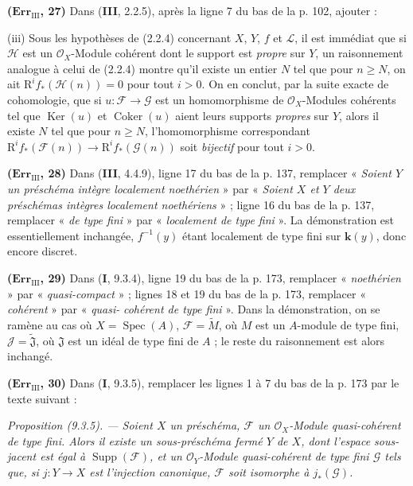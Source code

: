 \noindent\textbf{($\mathbf{Err}_{\mathrm{III}}$, 27)} Dans (\textbf{III}, 2.2.5),
après la ligne 7 du bas de la p. 102, ajouter :

(iii) Sous les hypothèses de (2.2.4) concernant $X$, $Y$, $f$ et $\mathscr L$,
il est immédiat que si $\mathscr H$ est un $\mathscr O_X$-Module cohérent dont
le support est \emph{propre} sur $Y$, un raisonnement analogue à celui de
(2.2.4) montre qu'il existe un entier $N$ tel que pour $n\geq N$, on ait
$\mathrm R^if_*(\mathscr H(n))=0$ pour tout $i>0$. On en conclut, par la suite
exacte de cohomologie, que si $u:\mathscr F\to\mathscr G$ est un homomorphisme
de $\mathscr O_X$-Modules cohérents tel que $\operatorname{Ker}(u)$ et
$\operatorname{Coker}(u)$ aient leurs supports \emph{propres} sur $Y$, alors il
existe $N$ tel que pour $n\geq N$, l'homomorphisme correspondant
$\mathrm R^if_*(\mathscr F(n))\to\mathrm R^if_*(\mathscr G(n))$ soit
\emph{bijectif} pour tout $i>0$.

\noindent\textbf{($\mathbf{Err}_{\mathrm{III}}$, 28)} Dans (\textbf{III}, 4.4.9),
ligne 17 du bas de la p. 137, remplacer « \emph{Soient $Y$ un préschéma
intègre localement noethérien} » par « \emph{Soient $X$ et $Y$ deux
préschémas intègres localement noethériens} » ; ligne 16 du bas de la p.
137, remplacer « \emph{de type fini} » par « \emph{localement de type
fini} ». La démonstration est essentiellement inchangée,
$f^{-1}(y)$ étant localement de type fini sur $\boldsymbol{k}(y)$, donc encore discret.

\noindent\textbf{($\mathbf{Err}_{\mathrm{III}}$, 29)} Dans (\textbf{I}, 9.3.4), ligne
19 du bas de la p. 173, remplacer « \emph{noethérien} » par
« \emph{quasi-compact} » ; lignes 18 et 19 du bas de la p. 173, remplacer
« \emph{cohérent} » par « \emph{quasi-}%
\emph{cohérent de type fini} ». Dans la
démonstration, on se ramène au cas où
$X=\operatorname{Spec}(A)$, $\mathscr F=\widetilde M$, où $M$ est un $A$-module
de type fini, $\mathscr J=\widetilde{\mathfrak J}$, où $\mathfrak J$ est un
idéal de type fini de $A$ ; le reste du raisonnement est alors inchangé.

\noindent\textbf{($\mathbf{Err}_{\mathrm{III}}$, 30)} Dans (\textbf{I}, 9.3.5),
remplacer les lignes 1 à 7 du bas de la p. 173 par le texte suivant :

\emph{Proposition (9.3.5). --- Soient $X$ un préschéma, $\mathscr F$ un
$\mathscr O_X$-Module quasi-cohérent de type fini. Alors il existe un
sous-préschéma fermé $Y$ de $X$, dont l'espace sous-jacent est égal à
$\operatorname{Supp}(\mathscr F)$, et un $\mathscr O_Y$-Module quasi-cohérent de
type fini $\mathscr G$ tels que, si $j:Y\to X$ est l'injection canonique,
$\mathscr F$ soit isomorphe à $j_*(\mathscr G)$.}

